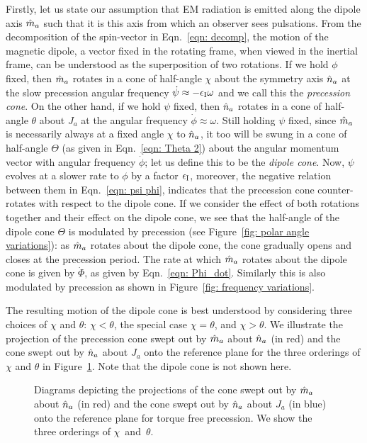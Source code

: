 \documentclass[../full_thesis/full_thesis.tex]{subfiles}
\begin{document}
Firstly, let us state our assumption that EM radiation is emitted along the
dipole axis $\hat{m}_a$ such that it is this axis from which an observer sees
pulsations.  From the decomposition of the spin-vector in Eqn.~\eqref{eqn:
decomp}, the motion of the magnetic dipole, a vector fixed in the rotating
frame, when viewed in the inertial frame, can be understood as the
superposition of two rotations.  If we hold $\phi$ fixed, then $\hat{m}_a$ rotates
in a cone of half-angle $\chi$ about the symmetry axis $\hat{n}_a$ at the slow
precession angular frequency $\dot{\psi}\approx -\epsilon_{\mathrm{I}} \omega$ and we call this
the \emph{precession cone}. On the other
hand, if we hold $\psi$ fixed, then $\hat{n}_a$ rotates in a cone of half-angle
$\theta$ about $J_{a}$ at the angular frequency $\dot{\phi} \approx \omega$.
Still holding $\psi$ fixed, since $\hat{m}_a$ is necessarily always at a fixed angle
$\chi$ to $\hat{n}_a$, it too will be swung in a cone of half-angle $\Theta$ (as
given in Eqn.~\eqref{eqn: Theta 2}) about the angular momentum vector with
angular frequency $\dot{\phi}$; let us define this to be the \emph{dipole
cone}. Now, $\psi$ evolves at a slower rate to $\phi$ by a factor $\epsilon_{\mathrm{I}}$,
moreover, the negative relation between them in Eqn.~\eqref{eqn: psi phi},
indicates that the precession cone counter-rotates with respect to the
dipole cone. If we consider the effect of both rotations together and their effect on the 
dipole cone, we see that the
half-angle of the dipole cone $\Theta$ is modulated by precession (see
Figure~\ref{fig: polar angle variations}): as $\hat{m}_a$ rotates about the dipole
cone, the cone gradually opens and closes at the precession period. The rate at
which $\hat{m}_a$ rotates about the dipole cone is given by $\dot{\Phi}$, as given
by Eqn.~\eqref{eqn: Phi_dot}. Similarly this is also modulated by precession as
shown in Figure~\ref{fig: frequency variations}. 

The resulting motion of the dipole cone is best understood by considering three
choices of $\chi$ and $\theta$: $\chi < \theta$, the special case $\chi =
\theta$, and $\chi > \theta$. We illustrate the projection of the precession cone swept
out by $\hat{m}_a$ about $\hat{n}_a$ (in red) and the cone swept out by $\hat{n}_a$ about $J_a$ onto
the reference plane for the three orderings of $\chi$ and $\theta$ in
Figure~\ref{fig: cones}. Note that the dipole cone is not shown here.
\begin{figure}[ht]
\centering
\caption{Diagrams depicting the projections of the cone swept out by $\hat{m}_a$
about $\hat{n}_a$ (in red) and the cone swept out by $\hat{n}_a$ about $J_a$ (in blue)
onto the reference plane for torque free precession. We show the three
orderings of $\chi$~and~$\theta$.}
\label{fig: cones}
\end{figure}
\end{document}
